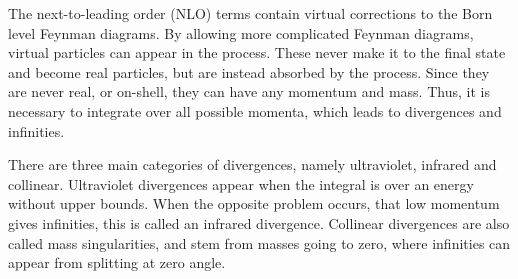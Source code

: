 \documentclass[twoside,english]{uiofysmaster}
\begin{document}
{The next-to-leading order (NLO) terms contain virtual corrections to the Born level Feynman diagrams. By allowing more complicated Feynman diagrams, virtual particles can appear in the process. These never make it to the final state and become real particles, but are instead absorbed by the process. Since they are never real, or on-shell, they can have any momentum and mass. Thus, it is necessary to integrate over all possible momenta, which leads to divergences and infinities. 

There are three main categories of divergences, namely ultraviolet, infrared and collinear. Ultraviolet divergences appear when the integral is over an energy without upper bounds. When the opposite problem occurs, that low momentum gives infinities, this is called an infrared divergence. Collinear divergences are also called mass singularities, and stem from masses going to zero, where infinities can appear from splitting at zero angle.

\begin{figure}
    \centering
    \begin{subfigure}[b]{0.8\textwidth}
\end{subfigure}
\end{figure}}
\end{document}
